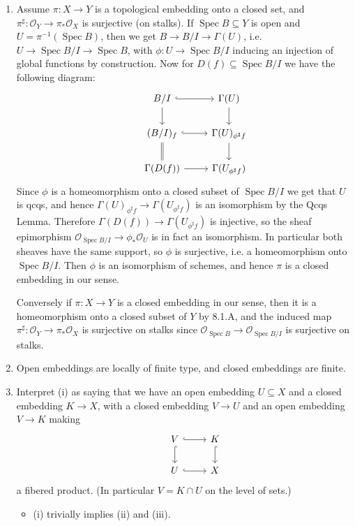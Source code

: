 \documentclass{report}
\renewcommand{\O}{\mathscr{O}} %
\DeclareMathOperator{\Spec}{Spec}
\begin{document}
\begin{enumerate}[label=\textbf{8.1.\Alph*.}]
	\item Assume $\pi:X\to Y$ is a topological embedding onto a closed set,
	      and $\pi^\sharp:\O_Y\to\pi_*\O_X$ is surjective (on stalks). If
	      $\Spec B\subseteq Y$ is open and $U=\pi^{-1}(\Spec B)$, then we get
	      $B\to B/I\to\Gamma(U)$, i.e. $U\to\Spec B/I\to\Spec B$, with
	      $\phi:U\to\Spec B/I$ inducing an injection of global functions by
	      construction. Now for $D(f)\subseteq\Spec B/I$ we have the following
	      diagram:
	      \begin{equation*}
		      \begin{tikzcd}
			      &B/I \ar[d] \ar[r,hook]
			      &\Gamma(U) \ar[d] \\
			      &(B/I)_f \ar[d,equal] \ar[r,hook]
			      &\Gamma(U)_{\phi^\sharp f} \ar[d] \\
			      &\Gamma(D(f)) \ar[r]
			      &\Gamma(U_{\phi^\sharp f})
		      \end{tikzcd}
	      \end{equation*}
	      Since $\phi$ is a homeomorphism onto a closed subset of $\Spec B/I$
	      we get that $U$ is qcqs, and hence
	      $\Gamma(U)_{\phi^\sharp f}\to\Gamma(U_{\phi^\sharp f})$ is an
	      isomorphism by the Qcqs Lemma. Therefore
	      $\Gamma(D(f))\to\Gamma(U_{\phi^\sharp f})$ is injective, so the sheaf
	      epimorphism $\O_{\Spec B/I}\to\phi_*\O_U$ is in fact an isomorphism.
	      In particular both sheaves have the same support, so $\phi$ is
	      surjective, i.e. a homeomorphism onto $\Spec B/I$. Then $\phi$ is an
	      isomorphism of schemes, and hence $\pi$ is a closed embedding in our
	      sense.

	      Conversely if $\pi:X\to Y$ is a closed embedding in our sense, then
	      it is a homeomorphism onto a closed subset of $Y$ by 8.1.A, and the
	      induced map $\pi^\sharp:\O_Y\to\pi_*\O_X$ is surjective on stalks
	      since $\O_{\Spec B}\to\O_{\Spec B/I}$ is surjective on stalks.

	\item Open embeddings are locally of finite type, and closed embeddings
	      are finite.

	\item Interpret (i) as saying that we have an open embedding
	      $U\subseteq X$ and a closed embedding $K\to X$, with a closed
	      embedding $V\to U$ and an open embedding $V\to K$ making
	      \begin{equation*}
		      \begin{tikzcd}
			      &V \ar[r,hook] \ar[d,hook] &K \ar[d,hook] \\
			      &U \ar[r,hook] &X
		      \end{tikzcd}
	      \end{equation*}
	      a fibered product. (In particular $V=K\cap U$ on the level of sets.)
	      \begin{itemize}
		      \item (i) trivially implies (ii) and (iii).


\end{itemize}
\end{enumerate}
\end{document}

